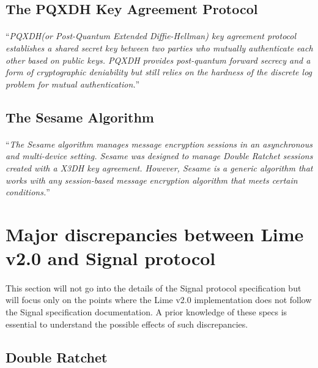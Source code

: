 \documentclass[a4paper,11pt]{article}
\begin{document}
  \subsection{The PQXDH Key Agreement Protocol}
    \paragraph{}\textquotedblleft \textit{\textquotesingle PQXDH\textquotesingle   (or  \textquotesingle Post-Quantum Extended Diffie-Hellman\textquotesingle  )\cite{pqxdh} key
agreement protocol establishes a shared secret key between two parties who mutually authenticate each other based on public keys. PQXDH provides post-quantum forward secrecy and a form of cryptographic deniability but still relies on the hardness of the discrete log problem for mutual authentication.}\textquotedblright

  \subsection{The Sesame Algorithm}
    \paragraph{}\textquotedblleft \textit{The Sesame algorithm\cite{sesame} manages message encryption
sessions in an asynchronous and multi-device setting.
Sesame was designed to manage Double Ratchet sessions\cite{doubleRatchet} created with a X3DH
key agreement\cite{x3dh}. However, Sesame is a generic algorithm that works with
any session-based message encryption algorithm that meets certain conditions.}\textquotedblright

\newpage
\section{Major discrepancies between Lime v2.0 and Signal protocol}
\paragraph{}This section will not go into the details of the Signal protocol specification but will focus only on the points where the Lime v2.0 implementation does not follow the Signal specification documentation\cite{doubleRatchet}\cite{x3dh}\cite{sesame}. A prior knowledge of these specs is essential to understand the possible effects of such discrepancies.

  \subsection{Double Ratchet}
\end{document}
